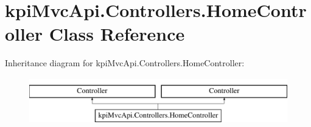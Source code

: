 \hypertarget{classkpi_mvc_api_1_1_controllers_1_1_home_controller}{}\section{kpi\+Mvc\+Api.\+Controllers.\+Home\+Controller Class Reference}
\label{classkpi_mvc_api_1_1_controllers_1_1_home_controller}
Inheritance diagram for kpi\+Mvc\+Api.\+Controllers.\+Home\+Controller\+:\begin{figure}[H]
\begin{center}
\leavevmode
\includegraphics[height=2.000000cm]{classkpi_mvc_api_1_1_controllers_1_1_home_controller}
\end{center}
\end{figure}
